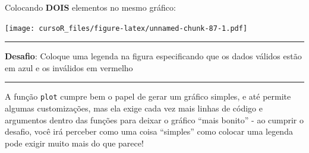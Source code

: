 \documentclass[]{book}
\newenvironment{Shaded}{\begin{snugshade}}{\end{snugshade}}
\newcommand{\KeywordTok}[1]{\textcolor[rgb]{0.13,0.29,0.53}{\textbf{#1}}}
\newcommand{\DataTypeTok}[1]{\textcolor[rgb]{0.13,0.29,0.53}{#1}}
\newcommand{\DecValTok}[1]{\textcolor[rgb]{0.00,0.00,0.81}{#1}}
\newcommand{\StringTok}[1]{\textcolor[rgb]{0.31,0.60,0.02}{#1}}
\newcommand{\CommentTok}[1]{\textcolor[rgb]{0.56,0.35,0.01}{\textit{#1}}}
\newcommand{\OperatorTok}[1]{\textcolor[rgb]{0.81,0.36,0.00}{\textbf{#1}}}
\newcommand{\NormalTok}[1]{#1}
\theoremstyle{definition}
\theoremstyle{definition}
\theoremstyle{definition}
\theoremstyle{remark}
\begin{document}
Colocando \textbf{DOIS} elementos no mesmo gráfico:

\begin{Shaded}
\end{Shaded}

\texttt{[image: cursoR\_files/figure-latex/unnamed-chunk-87-1.pdf]}

\begin{center}\rule{0.5\linewidth}{\linethickness}\end{center}

{\textbf{Desafio}: Coloque uma legenda na figura especificando que os
dados válidos estão em azul e os inválidos em vermelho }

\begin{center}\rule{0.5\linewidth}{\linethickness}\end{center}

A função \texttt{plot} cumpre bem o papel de gerar um gráfico simples, e
até permite algumas customizações, mas ela exige cada vez mais linhas de
código e argumentos dentro das funções para deixar o gráfico ``mais
bonito'' - ao cumprir o desafio, você irá perceber como uma coisa
``simples'' como colocar uma legenda pode exigir muito mais do que
parece!
\end{document}
